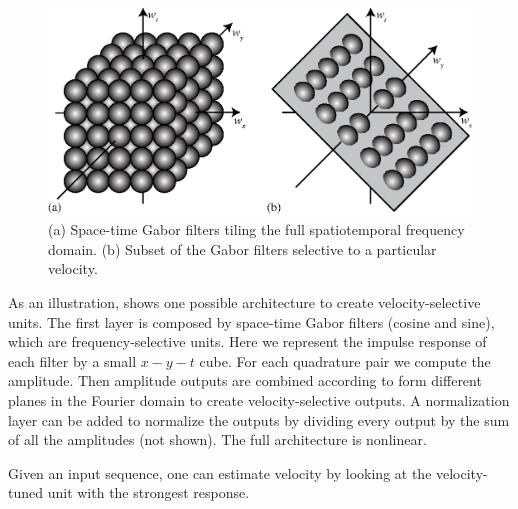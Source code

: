 \begin{figure}[t]
\centerline{
\includegraphics[width=1\linewidth]{figures/temporal_filters/gabor_spacetime_tiles.eps}
}
\caption{(a) Space-time Gabor filters tiling the full spatiotemporal frequency domain. (b) Subset of the Gabor filters selective to a particular velocity.}
\label{fig:spacetimetiles2}
\end{figure}


As an illustration, \fig{\ref{fig:MT_velocity_tuned}} shows one possible architecture to create velocity-selective units. 
The first layer is composed by space-time Gabor filters (cosine and sine), which are frequency-selective units. Here we represent the impulse response of each filter by a small $x-y-t$ cube. For each quadrature pair we compute the amplitude. Then amplitude outputs are combined according to form different planes in the Fourier domain to create velocity-selective outputs. A normalization layer can be added to normalize the outputs by dividing every output by the sum of all the amplitudes (not shown). The full architecture is nonlinear.


Given an input sequence, one can estimate velocity by looking at the velocity-tuned unit with the strongest response. 

